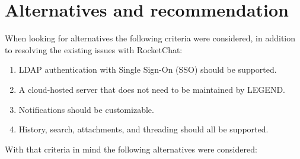 \documentclass[11pt,letterpaper]{article}
\begin{document}
\section{Alternatives and recommendation}
When looking for alternatives the following criteria were considered, in addition to resolving the existing issues with RocketChat:

\begin{enumerate}
\item LDAP authentication with Single Sign-On (SSO) should be supported. 
\item A cloud-hosted server that does not need to be maintained by LEGEND.
\item Notifications should be customizable.
\item History, search, attachments, and threading should all be supported. 
\end{enumerate}
With that criteria in mind the following alternatives were considered:
\end{document}
